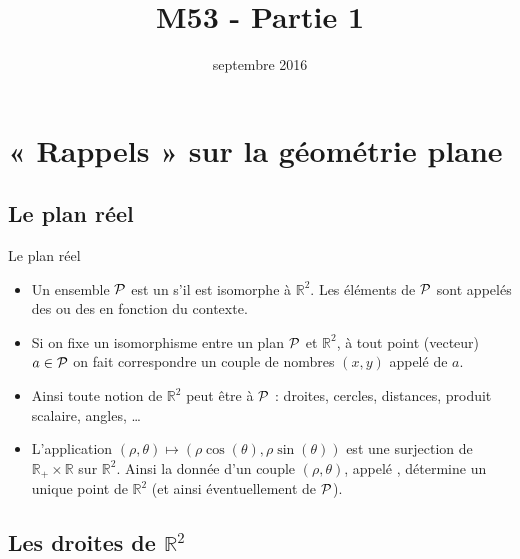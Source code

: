 \documentclass{m53beamer}
\title{M53 - Partie 1}
\date{septembre 2016}
\begin{document}
\begin{frame}
  \titlepage
\end{frame}
\section{« Rappels » sur la géométrie plane}

\subsection{Le plan réel}

\begin{frame}{Le plan réel}
  \begin{itemize}[<+(1)->]
    \item Un ensemble $\mathcal{P}$ est un  s'il est  isomorphe à $\mathbb{R}^{2}$. Les éléments de $\mathcal{P}$ sont appelés des  ou des  en fonction du contexte.
    \item Si on fixe un isomorphisme entre un plan $\mathcal{P}$ et $\mathbb{R}^{2}$, à tout point (vecteur) $a \in \mathcal{P}$ on fait correspondre un couple de nombres $(x,y)$ appelé  de $a$.
    \item Ainsi toute notion de $\mathbb{R}^{2}$ peut être  à $\mathcal{P}$ : droites, cercles, distances, produit scalaire, angles, \ldots
    \item L'application $(\rho,\theta) \mapsto (\rho\cos(\theta),\rho\sin(\theta))$ est une surjection de $\mathbb{R}_{+}\times\mathbb{R}$ sur $\mathbb{R}^{2}$. \pause Ainsi la donnée d'un couple $(\rho,\theta)$, appelé , détermine un unique point de $\mathbb{R}^{2}$ (et ainsi éventuellement de $\mathcal{P}$).
  \end{itemize}
\end{frame}

\subsection{Les droites de \texorpdfstring{$\mathbb{R}^{2}$}{R²}}
\end{document}
